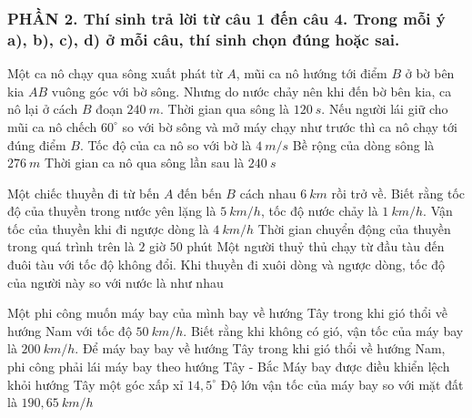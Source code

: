 \subsubsection*{PHẦN 2. Thí sinh trả lời từ câu 1 đến câu 4. Trong mỗi ý a), b), c), d) ở mỗi câu, thí sinh chọn đúng hoặc sai.}
\setcounter{ex}{0}
\begin{ex}%
Một ca nô chạy qua sông xuất phát từ $A$, mũi ca nô hướng tới điểm $B$ ở bờ bên kia $AB$ vuông góc với bờ sông. Nhưng do nước chảy nên khi đến bờ bên kia, ca nô lại ở cách $B$ đoạn $240\ m$. Thời gian qua sông là $120\ s$. Nếu người lái giữ cho mũi ca nô chếch $60^\circ$ so với bờ sông và mở máy chạy như trước thì ca nô chạy tới đúng điểm $B$.
{Tốc độ của ca nô so với bờ là $4 \ m/s$} 
{\True Bề rộng của dòng sông là $276\ m$} 
{\True Thời gian ca nô qua sông lần sau là $240\ s$} 
\loigiai{ 
\begin{itemchoice}
\itemch
\itemch
\itemch
\itemch
\end{itemchoice}
}
\end{ex}
\begin{ex}%
Một chiếc thuyền đi từ bến $A$ đến bến $B$ cách nhau $6\ km$ rồi trở về. Biết rằng tốc độ của thuyền trong nước yên lặng là $5\ km/h$, tốc độ nước chảy là $1 \ km/h$.
{\True Vận tốc của thuyền khi đi ngược dòng là $4\ km/h$} 
{Thời gian chuyển động của thuyền trong quá trình trên là $2$ giờ $50$ phút} 
{Một người thuỷ thủ chạy từ đầu tàu đến đuôi tàu với tốc độ không đổi. Khi thuyền đi xuôi dòng và ngược dòng, tốc độ của người này so với nước là như nhau} 
\loigiai{ 
\begin{itemchoice}
\itemch
\itemch
\itemch
\itemch
\end{itemchoice}
}
\end{ex}
\begin{ex}%
Một phi công muốn máy bay của mình bay về hướng Tây trong khi gió thổi về hướng Nam với tốc độ $50\ km/h$. Biết rằng khi không có gió, vận tốc của máy bay là $200 \ km/h$.
{\True Để máy bay bay về hướng Tây trong khi gió thổi về hướng Nam, phi công phải lái máy bay theo hướng Tây - Bắc} 
{\True Máy bay được điều khiển lệch khỏi hướng Tây một góc xấp xỉ $14,5^\circ$} 
{Độ lớn vận tốc của máy bay so với mặt đất là $190,65\ km/h$} 
\loigiai{ 
\begin{itemchoice}
\itemch
\itemch
\itemch
\itemch
\end{itemchoice}
}
\end{ex}
